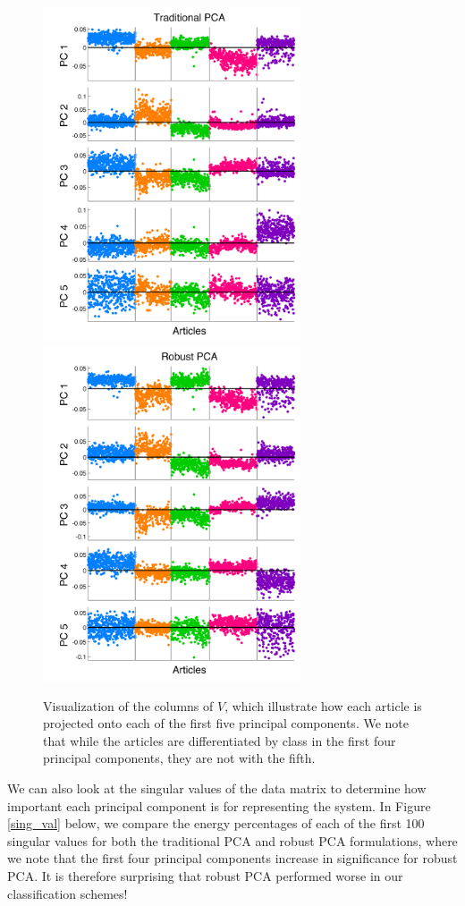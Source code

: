 \documentclass[12pt]{article}
\begin{document}
\begin{figure}[H]
\centering
\includegraphics[width=3in]{figures/principalcomponents_original} \quad
\includegraphics[width=3in]{figures/principalcomponents_robust}
\caption{Visualization of the columns of $V$, which illustrate how each article is projected onto each of the first five principal components. We note that while the articles are differentiated by class in the first four principal components, they are not with the fifth. }
\end{figure}

We can also look at the singular values of the data matrix to determine how important each principal component is for representing the system. In Figure \ref{sing_val} below, we compare the energy percentages of each of the first 100 singular values for both the traditional PCA and robust PCA formulations, where we note that the first four principal components increase in significance for robust PCA. It is therefore surprising that robust PCA performed worse in our classification schemes! 
\end{document}
